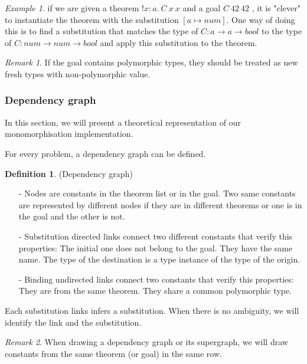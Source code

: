 \documentclass[a4paper, 11pt]{article}
\theoremstyle{plain}
\theoremstyle{definition}
\newtheorem*{mydef}{Definition}
\theoremstyle{remark}
\newtheorem*{remark}{Remark}
\newtheorem*{example}{Example}
\begin{document}
\begin{example} if we are given a theorem $!x:a.\ C\ x\ x$ and a goal $C \ 42\ 42$ , it is "clever" to instantiate the theorem with the substitution $[a \mapsto num]$. One way of doing this is to find a substitution that matches the type of $C : a \rightarrow a \rightarrow bool$ to the type of $C : num \rightarrow num \rightarrow bool$ and apply this substitution to the theorem.
\end{example}
 
\begin{remark}
If the goal contains polymorphic types, they should be treated as new fresh types with non-polymorphic value.
\end{remark} 
  


\subsubsection{Dependency graph}
In this section, we will present a theoretical representation of our monomorphisation implementation.
\vspace{2mm}

\noindent For every problem, a dependency graph can be defined. 
\begin{mydef} (Dependency graph)
\begin{enumerate}
  \item [-] Nodes are constants in the theorem list or in the goal. Two same constants are represented by different nodes if they are in different theorems or one is in the goal and the other is not.
  \item [-] {\color{blue}Substitution} directed links connect two different constants that verify this properties: 
    \subitem The initial one does not belong to the goal.
    \subitem They have the same name.
    \subitem The type of the destination is a type instance of the type of the origin. 
  \item [-] {\color{green}Binding} undirected links connect two constants that verify this properties: 
    \subitem They are from the same theorem.
    \subitem They share a common polymorphic type.    
\end{enumerate}    
Each substitution links infers a substitution. When there is no ambiguity, we will identify the link and the substitution.
\end{mydef}


\begin{remark}
When drawing a dependency graph or its supergraph, we will draw  constants from the same theorem (or goal) in the same row.
\end{remark}
\end{document}
